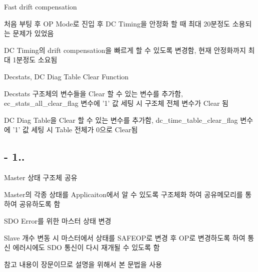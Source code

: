 \begin{DoxyEnumerate}
\item Fast drift compensation
\begin{DoxyItemize}
\item 처음 부팅 후 O\-P Mode로 진입 후 D\-C Timing을 안정화 할 때 최대 20분정도 소용되는 문제가 있었음
\item D\-C Timing의 drift compensation을 빠르게 할 수 있도록 변경함, 현재 안정화까지 최대 1분정도 소요됨
\end{DoxyItemize}
\item Decstats, D\-C Diag Table Clear Function
\begin{DoxyItemize}
\item Decstats 구조체의 변수들을 Clear 할 수 있는 변수를 추가함, ec\-\_\-stats\-\_\-all\-\_\-clear\-\_\-flag 변수에 '1' 값 세팅 시 구조체 전체 변수가 Clear 됨
\item D\-C Diag Table을 Clear 할 수 있는 변수를 추가함, dc\-\_\-time\-\_\-table\-\_\-clear\-\_\-flag 변수에 '1' 값 세팅 시 Table 전체가 0으로 Clear됨
\end{DoxyItemize}
\end{DoxyEnumerate}

\subsection*{-\/ 1..}


\begin{DoxyEnumerate}
\item Master 상태 구조체 공유
\begin{DoxyItemize}
\item Master의 각종 상태를 Applicaiton에서 알 수 있도록 구조체화 하여 공유메모리를 통하여 공유하도록 함
\end{DoxyItemize}
\item S\-D\-O Error를 위한 마스터 상태 변경
\begin{DoxyItemize}
\item Slave 개수 변동 시 마스터에서 상태를 S\-A\-F\-E\-O\-P로 변경 후 O\-P로 변경하도록 하여 통신 에러시에도 S\-D\-O 통신이 다시 재개될 수 있도록 함
\end{DoxyItemize}
\end{DoxyEnumerate}

 참고 내용이 장문이므로 설명을 위해서 본 문법을 사용  